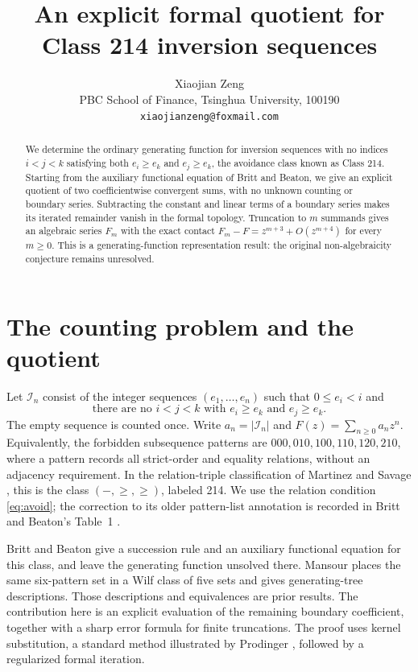 \documentclass[11pt]{article}
\title{An explicit formal quotient for\\Class 214 inversion sequences}
\author{Xiaojian Zeng\\[3pt]
  \small PBC School of Finance, Tsinghua University, 100190\\
  \small\texttt{xiaojianzeng@foxmail.com}}
\date{}
\begin{document}
\maketitle

\begin{abstract}
We determine the ordinary generating function for inversion sequences
with no indices $i<j<k$ satisfying both $e_i\ge e_k$ and $e_j\ge e_k$,
the avoidance class known as Class 214. Starting from the auxiliary
functional equation of Britt and Beaton, we give an explicit quotient
of two coefficientwise convergent sums, with no unknown counting or
boundary series. Subtracting the constant and linear terms of a boundary
series makes its iterated remainder vanish in the formal topology.
Truncation to $m$ summands gives an algebraic series $F_m$ with the exact
contact $F_m-F=z^{m+3}+O(z^{m+4})$ for every $m\ge0$.
This is a generating-function representation result: the original
non-algebraicity conjecture remains unresolved.
\end{abstract}

\section{The counting problem and the quotient}

Let $\mathcal I_n$ consist of the integer sequences $(e_1,\ldots,e_n)$
such that $0\le e_i<i$ and
\begin{equation}\label{eq:avoid}
  \text{there are no }i<j<k\text{ with }e_i\ge e_k\text{ and }e_j\ge e_k.
\end{equation}
The empty sequence is counted once. Write
$a_n=|\mathcal I_n|$ and $F(z)=\sum_{n\ge0}a_nz^n$.
Equivalently, the forbidden subsequence patterns are
$000,010,100,110,120,210$, where a pattern records all strict-order
and equality relations, without an adjacency requirement.
In the relation-triple classification of Martinez and Savage
\cite{MartinezSavage}, this is the class $(-,\ge,\ge)$, labeled 214.
We use the relation condition \eqref{eq:avoid}; the correction to its
older pattern-list annotation is recorded in Britt and Beaton's Table~1
\cite{BrittBeaton}.

Britt and Beaton \cite[Section~3.5, equations~(3.31)--(3.33)]{BrittBeaton}
give a succession rule and an auxiliary functional equation for this class,
and leave the generating function unsolved there. Mansour
\cite[Table~2, class~44, and Theorem~13]{Mansour} places the same six-pattern
set in a Wilf class of five sets and gives generating-tree descriptions.
Those descriptions and equivalences are prior results. The contribution
here is an explicit evaluation of the remaining boundary coefficient,
together with a sharp error formula for finite truncations.
The proof uses kernel substitution, a standard method illustrated by
Prodinger \cite{Prodinger}, followed by a regularized formal iteration.
\end{document}

